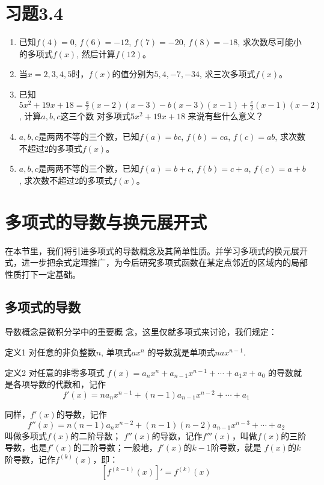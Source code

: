     \section*{习题3.4}
    \begin{enumerate}
        \item 已知$f(4)=0$, $f(6)=-12$, $f(7)=-20$,
        $f(8)=-18$, 求次数尽可能小的多项式$f(x)$, 然后计算$f(12)$。
        \item 当$x=2, 3, 4, 5$时，$f(x)$的值分别为$5, 4,-7,-34$, 求三次多项式$f(x)$。
        \item 已知$5x^2+19x+18=\frac{a}{2}(x-2)(x-3)-b(x-3)(x-1)+\frac{c}{2}(x-1)(x-2)$, 计算$a,b,c$这三个数
        对多项式$5x^2+19x+18$ 来说有些什么意义？
        \item $a,b,c$是两两不等的三个数，已知$f(a)=bc$, $f(b)=
        ca$, $f(c)=ab$, 求次数不超过2的多项式$f(x)$。
        \item $a,b,c$是两两不等的三个数，已知$f(a)=b+c$, $f(b)=
        c+a$, $f(c)=a+b$, 求次数不超过2的多项式$f(x)$。
    \end{enumerate}
    
    \section{多项式的导数与换元展开式}
    在本节里，我们将引进多项式的导数概念及其简单性质。并学习多项式的换元展开式，进一步把余式定理推广，为今后研究多项式函数在某定点邻近的区域内的局部性质打下一定基础。
    
    \subsection{多项式的导数}
    导数概念是微积分学中的重要概
    念，这里仅就多项式来讨论，我们规定：
    
\begin{blk}{定义1}
对任意的非负整数$n$, 单项式$ax^n$
的导数就是单项式$nax^{n-1}$.
\end{blk}    

     
\begin{blk}{定义2}
对任意的非零多项式
$f (x) =a_nx^n+a_{n-1}x^{n-1}+\cdots+a_1x+a_0$
的导数就是各项导数的代数和，记作
\[f' (x) =na_nx^{n-1}+(n-1)a_{n-1}x^{n-2}+\cdots +a_1\]

同样，$f'(x)$的导数，记作
\[f'' (x) =n (n-1) a_nx^{n-2} + (n-1) (n-2)a_{n-1}x^{n-3}+\cdots+a_2\]
叫做多项式$f(x)$的二阶导数；
$f''(x)$的导数，记作$f'''(x)$，叫做$f(x)$的三阶导数，也是$f'(x)$的二阶导数；一般地，$f'(x)$的$k-1$阶导数，就是
$f(x)$的$k$阶导数，记作$f^{(k)}(x)$，即：
\[\left[f^{(k-1)} (x)\right]'=f^{(k)}(x)\]
\end{blk}    

